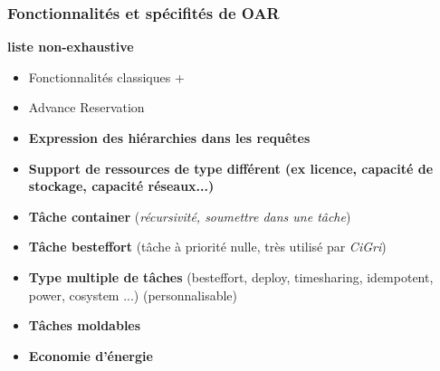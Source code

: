 \documentclass{beamer}
\begin{document}

\begin{frame}
\frametitle{Fonctionnalités et spécifités de OAR}
	{\bf liste non-exhaustive}
		\begin{itemize}
    \item Fonctionnalités classiques +
    \item Advance Reservation
		\item {\bf Expression des hiérarchies dans les requêtes }
		\item {\bf Support de ressources de type différent (ex licence, capacité de stockage, capacité réseaux...)  }
		\item {\bf Tâche container} ({\em récursivité, soumettre dans une tâche})
		\item {\bf Tâche besteffort} (tâche à priorité nulle, très utilisé par {\em CiGri}) 
		\item {\bf Type multiple de tâches} (besteffort, deploy, timesharing, idempotent, power, cosystem ...) (personnalisable)
    \item {\bf Tâches moldables}
    \item {\bf Economie d'énergie}
		
	\end{itemize}
\end{frame}
\end{document}
